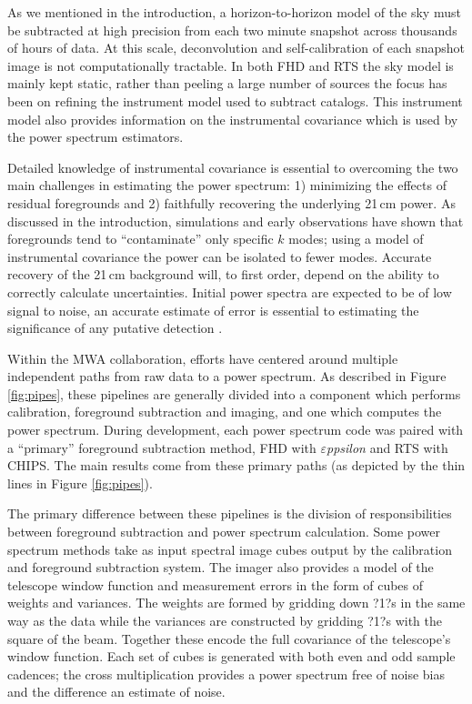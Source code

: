 \documentclass[twolcolumn]{emulateapj}
\def\eppsilon{{\it $\varepsilon$ppsilon}}
\begin{document}
As we mentioned in the introduction, a horizon-to-horizon model of the sky must be subtracted at high precision from each two minute snapshot across thousands of hours of data. At this scale, deconvolution and self-calibration of each snapshot image is not computationally tractable.  In both FHD and RTS the sky model is mainly kept static, rather than peeling a large number of sources the focus has been on refining the instrument model used to subtract catalogs.  This instrument model also provides information on the instrumental covariance which is used by the power spectrum estimators.


Detailed knowledge of instrumental covariance is essential to overcoming the two main challenges in estimating the power spectrum: 1) minimizing the effects of residual foregrounds and 2) faithfully recovering the underlying 21\,cm power.   As discussed in the introduction, simulations and early observations have shown that foregrounds tend to ``contaminate'' only specific $k$ modes; using a model of instrumental covariance the power can be isolated to fewer modes.  Accurate recovery of the 21\,cm background will, to first order, depend on the ability to correctly calculate uncertainties.  Initial power spectra are expected to be of low signal to noise, an accurate estimate of error is essential to estimating the significance of any putative detection \citep{Pober:2014p10390,Beardsley:2013p9952}. 


  Within the MWA collaboration, efforts have centered around multiple independent paths from raw data to a power spectrum.  As described in Figure \ref{fig:pipes}, these pipelines are generally divided into a component which performs calibration, foreground subtraction and imaging, and one which computes the power spectrum.  During development, each power spectrum code was paired with a ``primary'' foreground subtraction method, FHD with \eppsilon{} and RTS with CHIPS.   The main results come from these primary paths (as depicted by the thin lines in Figure \ref{fig:pipes}). 

The primary difference between these pipelines is the division of responsibilities between foreground subtraction and power spectrum calculation. Some power spectrum methods take as input spectral image cubes output by the calibration and foreground subtraction system.  The imager also provides a model of the telescope window function and measurement errors in the form of cubes of weights and variances. The weights are formed by gridding down ?1?s in the same way as the data while the variances are constructed by gridding ?1?s with the square of the beam. Together these encode the full covariance of the telescope's window function.  Each set of cubes is generated with both even and odd sample cadences; the cross multiplication provides a power spectrum free of noise bias and the difference an estimate of noise.
\end{document}
